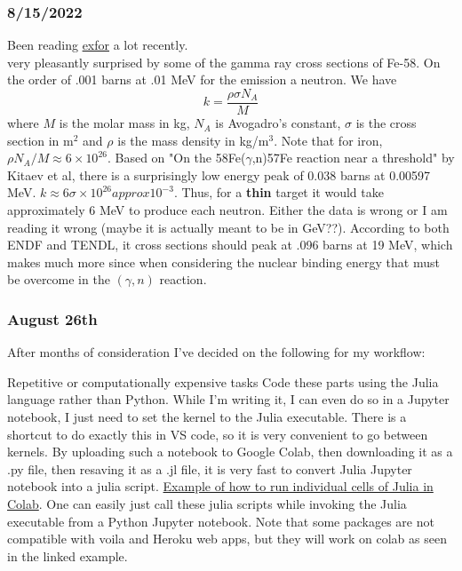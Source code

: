 \documentclass[12pt]{article}
\begin{document}
\subsubsection{8/15/2022}
Been reading \href{https://www-nds.iaea.org/exfor}{exfor} a lot recently. \\
very pleasantly surprised by some of the gamma ray cross sections of Fe-58. On the order of .001 barns at .01 MeV for the emission a neutron. We have 
\begin{equation}
    k = \frac{\rho\sigma N_A}{M}
\end{equation}
where $M$ is the molar mass in kg, $N_A$ is Avogadro's constant, $\sigma$ is the cross section in m$^2$ and $\rho$ is the mass density in kg/m$^3$. Note that for iron, $\rho N_A/M\approx 6\times10^{26}$.
Based on "On the 58Fe($\gamma$,n)57Fe reaction near a threshold" by Kitaev et al, there is a surprisingly low energy peak of 0.038 barns at 0.00597 MeV. 
$k\approx  6\sigma\times10^{26} approx  10^{-3}$. Thus, for a \textbf{thin} target it would take approximately 6 MeV to produce each neutron. Either the data is wrong or I am reading it wrong (maybe it is actually meant to be in GeV??). According to both ENDF and TENDL, it cross sections should peak at .096 barns at 19 MeV, which makes much more since when considering the nuclear binding energy that must be overcome in the $(\gamma,n)$ reaction. 
\subsubsection{August 26th}
After months of consideration I've decided on the following for my workflow: 
\begin{outline}
\1 Repetitive or computationally expensive tasks
    \2 Code these parts using the Julia language rather than Python. While I'm writing it, I can even do so in a Jupyter notebook, I just need to set the kernel to the Julia executable. There is a shortcut to do exactly this in VS code, so it is very convenient to go between kernels. 
    \2 By uploading such a notebook to Google Colab, then downloading it as a .py file, then resaving it as a .jl file, it is very fast to convert Julia Jupyter notebook into a julia script. 
    \2 \href{https://colab.research.google.com/drive/1vUglHFSJJcE75oV5qs9fQFAh6yQPVIiF?usp=sharing}{
    Example of how to run individual cells of Julia in Colab}. One can easily just call these julia scripts while invoking the Julia executable from a Python Jupyter notebook. Note that some packages are not compatible with voila and Heroku web apps, but they will work on colab as seen in the linked example. 
\end{outline}
\end{document}
